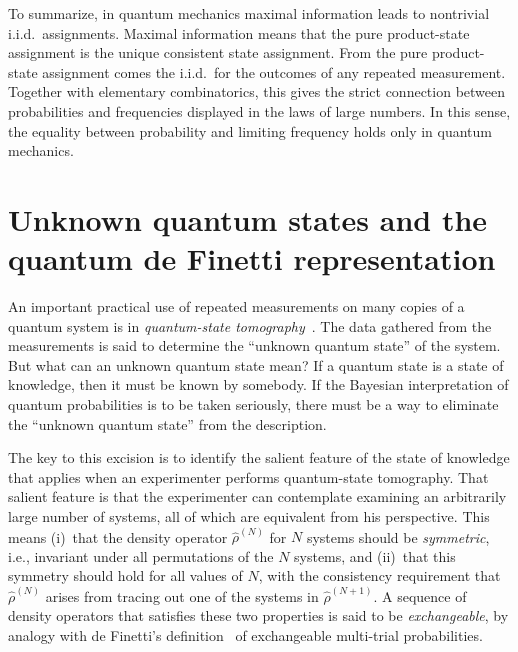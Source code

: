 To summarize, in quantum mechanics maximal information leads to
nontrivial i.i.d.\ assignments.  Maximal information means that the
pure product-state assignment is the unique consistent state
assignment.  From the pure product-state assignment comes the i.i.d.\
for the outcomes of any repeated measurement.  Together with
elementary combinatorics, this gives the strict connection between
probabilities and frequencies displayed in the laws of large numbers.
In this sense, the equality between probability and limiting
frequency holds only in quantum mechanics.

\section{Unknown quantum states and the quantum de Finetti
representation}

An important practical use of repeated measurements on many copies
of a quantum system is in {\it quantum-state
tomography\/}~\cite{Leonhardt,Buzek98}.  The data gathered from the
measurements is said to determine the ``unknown quantum state'' of
the system. But what can an unknown quantum state mean?  If a quantum
state is a state of knowledge, then it must be known by somebody.  If
the Bayesian interpretation of quantum probabilities is to be taken
seriously, there must be a way to eliminate the ``unknown quantum
state'' from the description.

The key to this excision is to identify the salient feature of the
state of knowledge that applies when an experimenter performs
quantum-state tomography.  That salient feature is that the
experimenter can contemplate examining an arbitrarily large number of
systems, all of which are equivalent from his perspective.  This
means (i)~that the density operator $\hat\rho^{(N)}$ for $N$ systems
should be {\it symmetric}, i.e., invariant under all permutations of
the $N$ systems, and (ii)~that this symmetry should hold for all
values of $N$, with the consistency requirement that
$\hat\rho^{(N)}$ arises from tracing out one of the systems in
$\hat\rho^{(N+1)}$.  A sequence of density operators that satisfies
these two properties is said to be {\it exchangeable}, by analogy
with de Finetti's definition~\cite{DeFinettiBook} of exchangeable
multi-trial probabilities.

